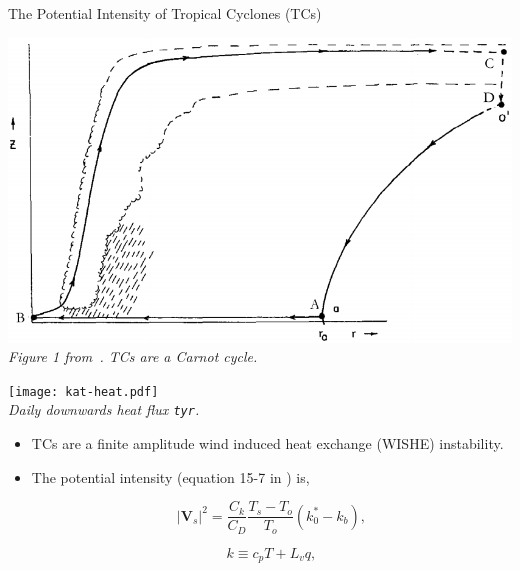 \begin{frame}{The Potential Intensity of Tropical Cyclones (TCs)}
\vspace{-30pt}
\hspace{-30pt}\begin{minipage}{1.1\linewidth}
\centering
\begin{minipage}{0.45\linewidth}
\centering
    \includegraphics[width=\linewidth]{images/hurricane-carnot.png}\\
    \textit{Figure 1 from~\cite{emanuel1991theory}.
    TCs are a Carnot cycle. }
    \end{minipage}
\begin{minipage}{0.45\linewidth}
\texttt{[image: kat-heat.pdf]}\\
\textit{Daily downwards heat flux
        \texttt{tyr}.}
       \end{minipage}
\end{minipage}
\begin{itemize}
\item TCs are a finite amplitude wind induced heat exchange (WISHE) instability.
\item The potential intensity (equation 15-7 in \cite{emanuel2018progress}) is,

\begin{minipage}{0.45\linewidth}
\begin{equation}
\left|\mathbf{V}_{s}\right|^{2}=\frac{C_{k}}{C_{D}}
\frac{T_{s}-T_{o}}{T_{o}}\left(k_{0}^{*}-k_b\right),
\tag{PI}
\label{eq:PI}
\end{equation}
\end{minipage}
\begin{minipage}{0.45\linewidth}
\begin{equation}
k \equiv c_{p} T+L_{v} q,
\label{eq:enthalpy_per_unit_mass}
\end{equation}
\end{minipage}
\end{itemize}
\end{frame}

